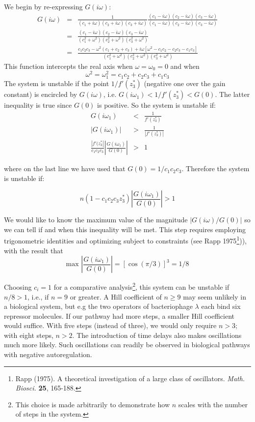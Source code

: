 \documentclass{article}
\begin{document}
We begin by re-expressing $G(i\omega)$:
\begin{eqnarray*}
G(i\omega) & = & \frac{1}{(c_1 + i \omega)(c_2 + i \omega)(c_3 + i \omega)} \frac{(c_1 - i \omega)(c_2 - i \omega)(c_3 - i \omega)}{(c_1 - i \omega)(c_2 - i \omega)(c_3 - i \omega)}\\
& = & \frac{(c_1 - i \omega)(c_2 - i \omega)(c_3 - i \omega)}{(c_1^2 + \omega^2)(c_2^2 + \omega^2)(c_3^2 + \omega^2)}\\
& = & \frac{c_1c_2c_3 - \omega^2 (c_1 + c_2 + c_3) + i \omega \left[ \omega^2 - c_1c_2 - c_2c_3 - c_1 c_3 \right]}{(c_1^2 + \omega^2)(c_2^2 + \omega^2)(c_3^2 + \omega^2)}
\end{eqnarray*}
This function intercepts the real axis when $\omega = \omega_0 = 0$ and when
\[ \omega^2 = \omega_1^2 = c_1c_2 + c_2c_3 + c_1 c_3 \]
The system is unstable if the point $1/f'(z_3^*)$ (negative one over the gain constant) is encircled by $G(i\omega)$, i.e. $G(i \omega_1) < 1/f'(z_3^*) < G(0)$. The latter inequality is true since $G(0)$ is positive. So the system is unstable if:
\begin{eqnarray*}
G(i \omega_1) & < & \frac{1}{f'(z_3^*)}\\
\left| G(i \omega_1) \right| & > & \frac{1}{\left| f'(z_3^*) \right|}\\
\frac{\left| f'(z_3^*  \right|}{c_1c_2c_3}  \left| \frac{G(i \omega_1)}{G(0)} \right| & > & 1
\end{eqnarray*}

where on the last line we have used that $G(0) = 1/c_1c_2c_3$. Therefore the system is unstable if:

\[ n \left( 1 - c_1c_2c_3 z_3^* \right) \left| \frac{G(i \omega_1)}{G(0)} \right| > 1 \]

We would like to know the maximum value of the magnitude $| G(i \omega)/G(0) |$ so we can tell if and when this inequality will be met. This step requires employing trigonometric identities and optimizing subject to constraints (see Rapp 1975\footnote{Rapp (1975). A theoretical investigation of a large class of oscillators. \textit{Math. Biosci.} \textbf{25}, 165-188.})), with the result that
\[ \textrm{max } \left| \frac{G(i \omega_1)}{G(0)} \right| = \left[ \cos (\pi/3) \right]^3 = 1/8\]

Choosing $c_i=1$ for a comparative analysis\footnote{This choice is made arbitrarily to demonstrate how $n$ scales with the number of steps in the system.}, this system can be unstable if $n/8 > 1$, i.e., if $n=9$ or greater. A Hill coefficient of $n \geq 9$ may seem unlikely in a biological system, but e.g the two operators of bacteriophage $\lambda$ each bind six repressor molecules. If our pathway had more steps, a smaller Hill coefficient would suffice. With five steps (instead of three), we would only require $n > 3$; with eight steps, $n> 2$. The introduction of time delays also makes oscillations much more likely. Such oscillations can readily be observed in biological pathways with negative autoregulation.
\end{document}
